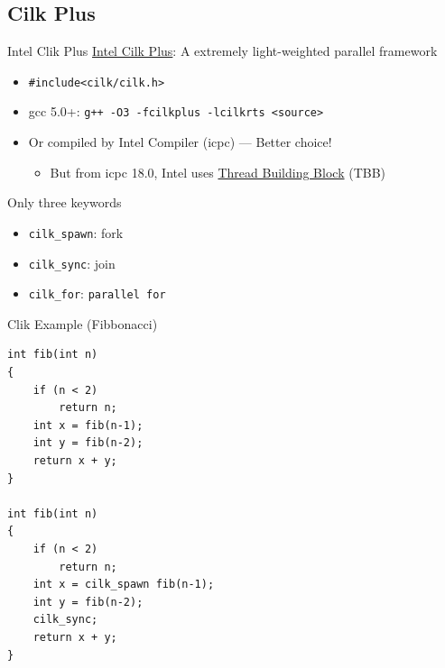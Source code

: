 \documentclass{../TexTemplate/myslide}
\begin{document}
\subsection{Cilk Plus}
\begin{frame}
\subsectionpage
\end{frame}

\begin{frame}[fragile]{Intel Clik Plus}
\href{https://www.cilkplus.org/}{Intel Cilk Plus}: A extremely light-weighted parallel framework
\begin{itemize}
	\item \verb'#include<cilk/cilk.h>'
	\item gcc 5.0+: \verb'g++ -O3 -fcilkplus -lcilkrts <source>'
	\item Or compiled by Intel Compiler (icpc) --- Better choice!
	\begin{itemize}
		\item But from icpc 18.0, Intel uses \href{https://software.intel.com/en-us/articles/migrate-your-application-to-use-openmp-or-intelr-tbb-instead-of-intelr-cilktm-plus?_ga=2.174275746.1279103381.1550824040-508775473.1544510410}{Thread Building Block} (TBB)
	\end{itemize}
\end{itemize}
Only three keywords
\begin{itemize}
	\item \verb'cilk_spawn': fork
	\item \verb'cilk_sync': join
	\item \verb'cilk_for': \verb'parallel for'
\end{itemize}
\end{frame}

\begin{frame}[fragile]{Clik Example (Fibbonacci)}
\begin{lstlisting}
int fib(int n)
{
    if (n < 2)
        return n;
    int x = fib(n-1);
    int y = fib(n-2);
    return x + y;
}

int fib(int n)
{
    if (n < 2)
        return n;
    int x = cilk_spawn fib(n-1);
    int y = fib(n-2);
    cilk_sync;
    return x + y;
}
\end{lstlisting}
\end{frame}
\end{document}

